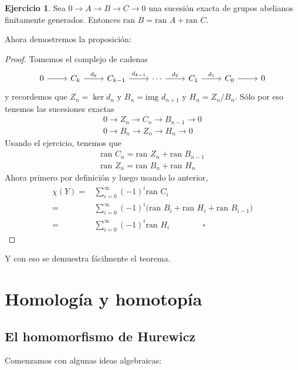 \documentclass[spanish]{book}
\theoremstyle{definition}
\newtheorem*{ejer}{Ejercicio}
\begin{document}
	\begin{ejer}
		Sea $0\to A\to B\to C\to 0$ una sucesión exacta de grupos abelianos finitamente generados. Entonces $\text{ran }B=\text{ran }A+\text{ran }C$.
	\end{ejer}
	Ahora demostremos la proposición:
	\begin{proof}
		Tomemos el complejo de cadenas
		\[\begin{tikzcd}
			0 \arrow[r] & C_k \arrow[r, "d_k"] & C_{k-1} \arrow[r, "d_{k-1}"] & \cdots \arrow[r, "d_2"] & C_1 \arrow[r, "d_1"] & C_0 \arrow[r] & 0
		\end{tikzcd}\]
		y recordemos que $Z_n=\ker d_n$ y $B_n=\text{img }d_{n+1}$ y $H_n=Z_n/B_n$. Sólo por eso tenemos las sucesiones exactas
		\begin{align*}
			0\to Z_n\to C_n\to B_{n-1}\to 0\\
			0\to B_n\to Z_n\to H_n\to 0
		\end{align*}
		Usando el ejercicio, tenemos que
		\begin{align*}
			\text{ran }C_n=\text{ran }Z_n+\text{ran }B_{n-1}\\
			\text{ran }Z_n=\text{ran }B_n+\text{ran }H_{n}
		\end{align*}
		Ahora primero por definición y luego usando lo anterior,
		\begin{align*}\chi(Y)=&\sum_{i=0}^\infty(-1)^i\text{ran }C_i\\
			=&\sum_{i=0}^\infty(-1)^i\Big(\text{ran }B_i+\text{ran }H_i+\text{ran }B_{i-1}\Big)\\
			=&\sum_{i=0}^\infty(-1)^i\text{ran }H_i\qquad\qquad\square
		\end{align*}
	\end{proof}
	Y con eso se demuestra fácilmente el teorema.

\chapter{Homología y homotopía}	
\section{El homomorfismo de Hurewicz}
Comenzamos con algunas ideas algebraicas:
\end{document}
